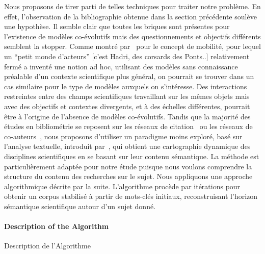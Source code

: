 {  Nous proposons de tirer parti de telles techniques pour traiter notre problème.
En effet, l'observation de la bibliographie obtenue dans la section précédente soulève une hypothèse. Il semble clair 
que toutes les briques sont présentes pour l'existence de modèles co-évolutifs mais des questionnements et objectifs différents semblent la stopper. Comme montré par~\cite{commenges:tel-00923682} pour le concept de mobilité, pour lequel un ``petit monde d'acteurs'' [c'est Hadri, des corsards des Ponts..]
 relativement fermé a inventé une notion ad hoc, utilisant des modèles sans connaissance préalable d'un contexte scientifique plus général, on pourrait se trouver dans un cas similaire pour le type de modèles auxquels on s'intéresse. Des interactions restreintes entre des champs scientifiques travaillant sur les mêmes objets mais avec des objectifs et contextes divergents, et à des échelles différentes, pourrait être à l'origine de l'absence de modèles co-évolutifs. 
Tandis que la majorité des études en bibliométrie se reposent sur les réseaux de citation~\cite{2013arXiv1310.8220N} ou les réseaux de co-auteurs~\cite{2014arXiv1402.7268S}, nous proposons d'utiliser un paradigme moins exploré, basé sur l'analyse textuelle, introduit par~\cite{chavalarias2013phylomemetic}, qui obtient une cartographie dynamique des disciplines scientifiques en se basant sur leur contenu sémantique. 
 La méthode est particulièrement adaptée pour notre étude puisque nous voulons comprendre la structure du contenu des recherches sur le sujet. Nous appliquons une approche algorithmique décrite par la suite. L'algorithme procède par itérations pour obtenir un corpus stabilisé à partir de mots-clés initiaux, reconstruisant l'horizon sémantique scientifique autour d'un sujet donné.
}


\paragraph{Description of the Algorithm}{Description de l'Algorithme}


